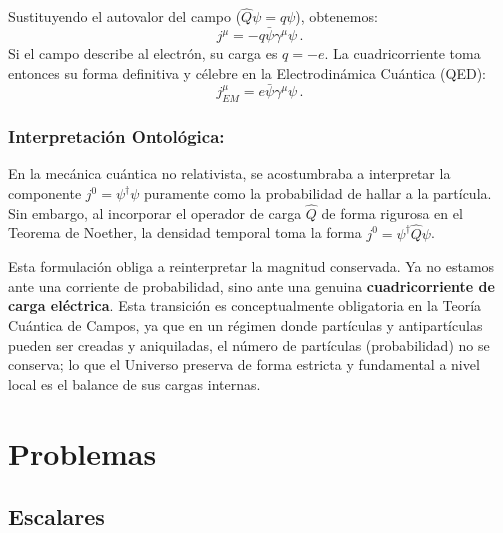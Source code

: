 \begin{frame}
Sustituyendo el autovalor del campo ($\hat{Q}\psi = q\psi$), obtenemos:
\begin{equation}
    j^\mu = -q \bar{\psi}\gamma^\mu \psi \, .
\end{equation}
Si el campo describe al electrón, su carga es $q = -e$. La cuadricorriente toma entonces su forma definitiva y célebre en la Electrodinámica Cuántica (QED):
\begin{equation}
    j^\mu_{EM} = e \bar{\psi}\gamma^\mu \psi \, .
\end{equation}

\subsubsection*{Interpretación Ontológica:} 
En la mecánica cuántica no relativista, se acostumbraba a interpretar la componente $j^0 = \psi^\dagger \psi$ puramente como la probabilidad de hallar a la partícula. Sin embargo, al incorporar el operador de carga $\hat{Q}$ de forma rigurosa en el Teorema de Noether, la densidad temporal toma la forma $j^0 = \psi^\dagger \hat{Q} \psi$. 

Esta formulación obliga a reinterpretar la magnitud conservada. Ya no estamos ante una corriente de probabilidad, sino ante una genuina \textbf{cuadricorriente de carga eléctrica}. Esta transición es conceptualmente obligatoria en la Teoría Cuántica de Campos, ya que en un régimen donde partículas y antipartículas pueden ser creadas y aniquiladas, el número de partículas (probabilidad) no se conserva; lo que el Universo preserva de forma estricta y fundamental a nivel local es el balance de sus cargas internas.

\end{frame}

\section{Problemas}


\subsection{Escalares}

